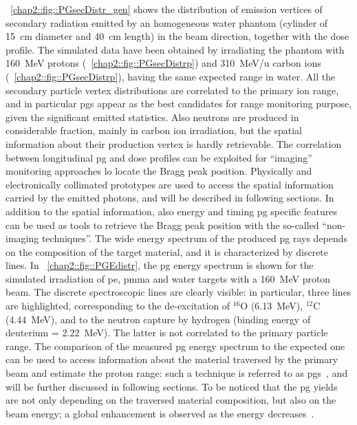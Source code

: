\figurename~\ref{chap2::fig::PGsecDistr_gen} shows the distribution of emission vertices  of secondary radiation emitted by an homogeneous water phantom (cylinder of 15~cm diameter and 40~cm length) in the beam direction, together with the dose profile. The simulated data have been obtained by irradiating the phantom with 160~MeV protons (\figurename~\ref{chap2::fig::PGsecDistrp}) and 310~MeV/u carbon ions (\figurename~\ref{chap2::fig::PGsecDistrp}), having the same expected range in water. All the secondary particle vertex distributions are correlated to the primary ion range, and in particular \glspl{pg} appear as the best candidates for range monitoring purpose, given the significant emitted statistics. Also neutrons are produced in considerable fraction, mainly in carbon ion irradiation, but the spatial information about their production vertex is hardly retrievable.  The correlation between longitudinal \gls{pg} and dose profiles can be exploited for \enquote{imaging} monitoring approaches lo locate the Bragg peak position. Physically and electronically collimated prototypes are used to access the spatial information carried by the emitted photons, and will be described in following sections. 
In addition to the spatial information, also energy and timing \gls{pg} specific features can be used as tools to retrieve the Bragg peak position with the so-called \enquote{non-imaging techniques}. The wide energy spectrum of the produced \gls{pg} rays  depends on the composition of the target material, and it is characterized by discrete lines. In \figurename~\ref{chap2::fig::PGEdistr}, the \gls{pg} energy spectrum is shown for the simulated irradiation of \gls{pe}, \gls{pmma} and water targets with a 160~MeV proton beam. The discrete spectroscopic lines are clearly visible: in particular, three lines are highlighted, corresponding to the de-excitation of $^{16}$O (6.13~MeV), $^{12}$C (4.44~MeV), and to the neutron capture by hydrogen (binding energy of deuterium = 2.22~MeV). The latter is not correlated to the primary particle range. The comparison of the measured \gls{pg} energy spectrum to the expected one can be used to access information about the material traversed by the primary beam and estimate the proton range: such a technique is referred to as \gls{pgs}~\parencite{Verburg2014}, and will be further discussed in following sections. To be noticed that the \gls{pg} yields are not only depending on the traversed material composition, but also on the beam energy; a global enhancement is observed as the energy decreases~\parencite{Krimmer2017}.  

